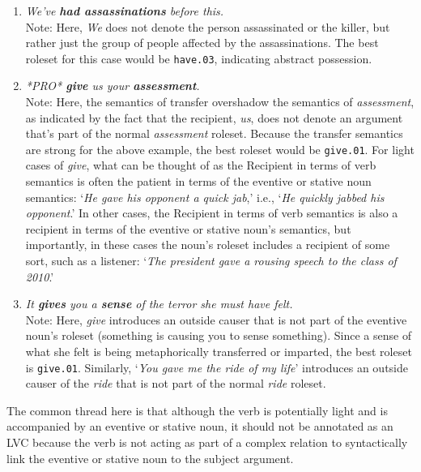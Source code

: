 \documentclass[11pt]{report}
\begin{document}
\begin{enumerate}
\item \textit{We've \textbf{had assassinations} before this.}\\
Note: Here, \textit{We} does not denote the person assassinated or the killer, but rather just the group of people affected by the assassinations.  The best roleset for this case would be \texttt{have.03}, indicating abstract possession.  

\item\textit{*PRO* \textbf{give} us your \textbf{assessment}.}\\
Note: Here, the semantics of transfer overshadow the semantics of \textit{assessment}, as indicated by the fact that the recipient, \textit{us}, does not denote an argument that's part of the normal \textit{assessment} roleset.  Because the transfer semantics are strong for the above example, the best roleset would be \texttt{give.01}.  For light cases of \textit{give}, what can be thought of as the Recipient in terms of verb semantics is often the patient in terms of the eventive or stative noun semantics: `\textit{He gave his opponent a quick jab},' i.e., `\textit{He quickly jabbed his opponent}.'  In other cases, the Recipient in terms of verb semantics is also a recipient in terms of the eventive or stative noun's semantics, but importantly, in these cases the noun's roleset includes a recipient of some sort, such as a listener: `\textit{The president gave a rousing speech to the class of 2010}.'

\item\textit{It \textbf{gives} you a \textbf{sense} of the terror she must have felt.}\\
Note: Here, \textit{give} introduces an outside causer that is not part of the eventive noun's roleset (something is causing you to sense something).  Since a sense of what she felt is being metaphorically transferred or imparted, the best roleset is \texttt{give.01}. Similarly, `\textit{You gave me the ride of my life}' introduces an outside causer of the \textit{ride} that is not part of the normal \textit{ride} roleset. 
\end{enumerate} 

The common thread here is that although the verb is potentially light and is accompanied by an eventive or stative noun, it should not be annotated as an LVC because the verb is not acting as part of a complex relation to syntactically link the eventive or stative noun to the subject argument. 
\end{document}
